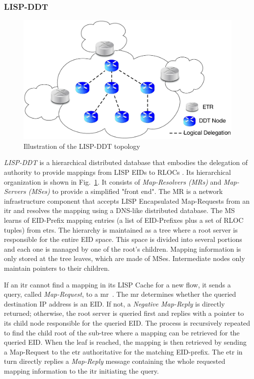 \subsubsection{LISP-DDT}
\label{sec:lispddt}
\begin{figure}[!t]
	\centering
	\includegraphics[width=\textwidth]{Chapter2/Pics/LISP_DDT.eps}
	\caption{Illustration of the LISP-DDT topology}
	\label{LISP_DDT}
\end{figure}
\emph{LISP-DDT} is a hierarchical distributed database that embodies the delegation of authority to provide mappings from LISP EIDs to RLOCs . Its hierarchical organization is shown in Fig.~\ref{LISP_DDT}. It consists of \emph{Map-Resolvers (MRs)} and \emph{Map-Servers (MSes)} to provide a simplified "front end". The MR is a network infrastructure component that accepts LISP Encapsulated Map-Requests from an \acrshort{itr} and resolves the mapping using a DNS-like distributed database. The MS learns of EID-Prefix mapping entries (a list of EID-Prefixes plus a set of RLOC tuples) from \acrshort{etr}s. The hierarchy is maintained as a tree where a root server is responsible for the entire EID space. This space is divided into several portions and each one is managed by one of the root’s children.
Mapping information is only stored at the tree leaves, which are made of MSes. Intermediate nodes only maintain pointers to their children.

If an \acrshort{itr} cannot find a mapping in its LISP Cache for a new flow, it sends a query, called \emph{Map-Request}, to a \acrshort{mr}~\cite{rfc6833}. The \acrshort{mr} determines whether the queried destination IP address is an EID. If not, a \emph{Negative Map-Reply} is directly returned; otherwise, the root server is queried first and replies with a pointer to its child node responsible for the queried EID. The process is recursively repeated to find the child root of the sub-tree where a mapping can be retrieved for the queried EID. When the leaf is reached, the mapping is then retrieved by sending a Map-Request to the \acrshort{etr} authoritative for the matching EID-prefix. The \acrshort{etr} in turn directly replies a \emph{Map-Reply} message containing the whole requested mapping information to the \acrshort{itr} initiating the query.

